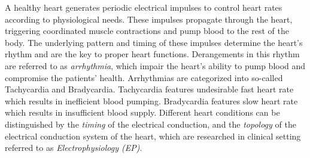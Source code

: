 A healthy heart generates periodic electrical impulses to control heart rates according to physiological needs. 
These impulses propagate through the heart, triggering coordinated muscle contractions and pump blood to the rest of the body. 
The underlying pattern and timing of these impulses determine the heart's rhythm and are the key to proper heart functions. 
Derangements in this rhythm are referred to as \emph{arrhythmia}, which impair the heart's ability to pump blood and compromise the patients' health. 
Arrhythmias are categorized into so-called Tachycardia and Bradycardia. 
Tachycardia features undesirable fast heart rate which results in inefficient blood pumping. Bradycardia features slow heart rate which results in insufficient blood supply. Different heart conditions can be distinguished by the \emph{timing} of the electrical conduction, and the \emph{topology} of the electrical conduction system of the heart, which are researched in clinical setting referred to as \emph{Electrophysiology (EP)}\cite{josephson}. 



